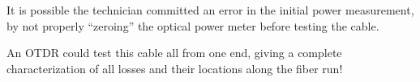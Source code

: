 \vskip 10pt

It is possible the technician committed an error in the initial power measurement, by not properly ``zeroing'' the optical power meter before testing the cable.

\vskip 10pt

An OTDR could test this cable all from one end, giving a complete characterization of all losses and their locations along the fiber run!






